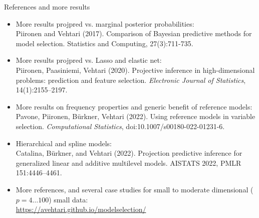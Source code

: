 \documentclass[english,t]{beamer}
\begin{document}
\begin{frame}{References and more results}

  \vspace{-1\baselineskip}
  {\footnotesize
  \begin{itemize}
  \item More results projpred vs. marginal posterior probabilities:\\
    Piironen and Vehtari (2017). Comparison of Bayesian predictive
    methods for model selection. Statistics and Computing,
    27(3):711-735.
  \item More results projpred vs. Lasso and elastic net:\\
    Piironen, Paasiniemi, Vehtari (2020). Projective inference in
    high-dimensional problems: prediction and feature selection.
    \textit{Electronic Journal of Statistics}, 14(1):2155--2197.
  \item More results on frequency properties and generic benefit of reference models:\\
    Pavone, Piironen, Bürkner, Vehtari (2022). Using reference models
    in variable selection.  \textit{Computational Statistics},
    doi:10.1007/s00180-022-01231-6.
  \item Hierarchical and spline models: \\
    Catalina, Bürkner, and Vehtari (2022). Projection predictive
    inference for generalized linear and additive multilevel
    models. AISTATS 2022, PMLR 151:4446–4461.
  \item More references, and several case studies for small to moderate dimensional ($p=4 \ldots 100$) small data:\\
    \url{https://avehtari.github.io/modelselection/}
  \end{itemize}
  }
\end{frame}
\end{document}
